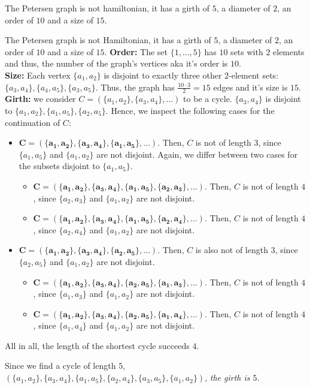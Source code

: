 \documentclass[a4paper]{article}
\begin{document}
\begin{solution}{9}
\begin{theorem}{The Petersen graph is not hamiltonian, it has a girth of $5$, a diameter of $2$, an order of $10$ and a size of $15$.}
\begin{theorem}{The Petersen graph is not Hamiltonian, it has a girth of $5$, a diameter of $2$, an order of $10$ and a size of $15$.}
			\textbf{Order:} The set $\{1, ..., 5\}$ has $10$ sets with $2$ elements and thus, the number of the graph's vertices aka it's order is $10$.\\
			
			\textbf{Size:} Each vertex $\{a_1, a_2\}$ is disjoint to exactly three other $2$-element sets: $\{a_3, a_4\}, \{a_4, a_5\}, \{a_3, a_5\}$. Thus, the graph has $\frac{10 \cdot 3}{2} = 15$ edges and it's size is $15$.\\

			\textbf{Girth:} we consider $C = (\{a_1, a_2\}, \{a_3, a_4\}, ...)$ to be a cycle. $\{a_3, a_4\}$ is disjoint to $\{a_1, a_2\}, \{a_1, a_5\}, \{a_2, a_5\}$. Hence, we inspect the following cases for the continuation of $C$:
			\begin{itemize}
				\item $\mathbf{C = (\{a_1, a_2\}, \{a_3, a_4\}, \{a_1, a_5\}, ...)}$. Then, $C$ is not of length $3$, since $\{a_1, a_5\}$ and $\{a_1, a_2\}$ are not disjoint. Again, we differ between two cases for the subsets disjoint to $\{a_1, a_5\}$.
					\begin{itemize}
						\item $\mathbf{C = (\{a_1, a_2\}, \{a_3, a_4\}, \{a_1, a_5\}, \{a_2, a_3\}, ...)}$. Then, $C$ is not of length $4$, since $\{a_2, a_3\}$ and $\{a_1, a_2\}$ are not disjoint.
						\item $\mathbf{C = (\{a_1, a_2\}, \{a_3, a_4\}, \{a_1, a_5\}, \{a_2, a_4\}, ...)}$. Then, $C$ is not of length $4$, since $\{a_2, a_4\}$ and $\{a_1, a_2\}$ are not disjoint.
					\end{itemize}
				\item $\mathbf{C = (\{a_1, a_2\}, \{a_3, a_4\}, \{a_2, a_5\}, ...)}$. Then, $C$ is also not of length $3$, since $\{a_2, a_5\}$ and $\{a_1, a_2\}$ are not disjoint.
					\begin{itemize}
						\item $\mathbf{C = (\{a_1, a_2\}, \{a_3, a_4\}, \{a_2, a_5\}, \{a_1, a_3\}, ...)}$. Then, $C$ is not of length $4$, since $\{a_1, a_3\}$ and $\{a_1, a_2\}$ are not disjoint.
						\item $\mathbf{C = (\{a_1, a_2\}, \{a_3, a_4\}, \{a_2, a_5\}, \{a_1, a_4\}, ...)}$. Then, $C$ is not of length $4$, since $\{a_1, a_4\}$ and $\{a_1, a_2\}$ are not disjoint.
					\end{itemize}
			\end{itemize}
			All in all, the length of the shortest cycle succeeds $4$.

			Since we find a cycle of length $5$, $(\{a_1, a_2\}, \{a_3, a_4\}, \{a_1, a_5\}, \{a_2, a_4\}, \{a_3, a_5\}, \{a_1, a_2\})$, \emph{the girth is $5$}.\\


\end{theorem}
\end{theorem}
\end{solution}
\end{document}

